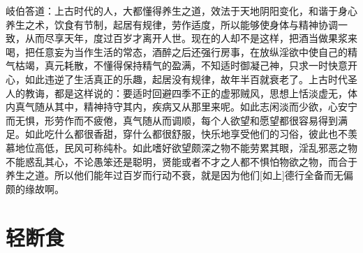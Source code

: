 \documentclass[12pt,oneside]{book}
\begin{document}
岐伯答道：上古时代的人，大都懂得养生之道，效法于天地阴阳变化，和谐于身心养生之术，饮食有节制，起居有规律，劳作适度，所以能够使身体与精神协调一致，从而尽享天年，度过百岁才离开人世。现在的人却不是这样，把酒当做果浆来喝，把任意妄为当作生活的常态，酒醉之后还强行房事，在放纵淫欲中使自己的精气枯竭，真元耗散，不懂得保持精气的盈满，不知适时御凝己神，只求一时快意开心，如此违逆了生活真正的乐趣，起居没有规律，故年半百就衰老了。上古时代圣人的教诲，都是这样说的：要适时回避四季不正的虚邪贼风，思想上恬淡虚无，体内真气随从其中，精神持守其内，疾病又从那里来呢。如此志闲淡而少欲，心安宁而无惧，形劳作而不疲倦，真气随从而调顺，每个人欲望和愿望都很容易得到满足。如此吃什么都很香甜，穿什么都很舒服，快乐地享受他们的习俗，彼此也不羡慕地位高低，民风可称纯朴。如此嗜好欲望颇深之物不能劳累其眼，淫乱邪恶之物不能惑乱其心，不论愚笨还是聪明，贤能或者不才之人都不惧怕物欲之物，而合于养生之道。所以他们能年过百岁而行动不衰，就是因为他们[如上]德行全备而无偏颇的缘故啊。


\chapter{轻断食}
\end{document}
